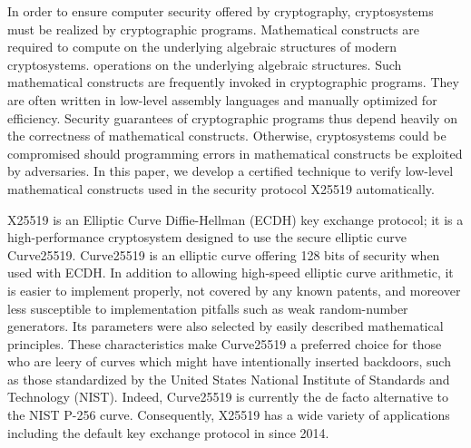 
In order to ensure computer security offered by cryptography,
cryptosystems must be realized by cryptographic programs. Mathematical
constructs are required to compute on the underlying algebraic
structures of modern cryptosystems.
operations on the underlying algebraic structures.
Such mathematical constructs are frequently invoked in cryptographic
programs. They are often written in low-level assembly languages and
manually optimized for efficiency. 
Security guarantees of cryptographic programs
thus depend heavily on the correctness of mathematical constructs.
Otherwise, cryptosystems could be compromised should programming
errors in mathematical constructs be exploited by adversaries.
In this paper, we develop a certified technique to verify low-level
mathematical constructs used in the security protocol X25519
automatically.

X25519 is an Elliptic Curve Diffie-Hellman (ECDH) key exchange
protocol; it is a high-performance cryptosystem designed to 
use the secure elliptic curve Curve25519. Curve25519 is an elliptic
curve offering 128 bits of security when used with ECDH. In addition
to allowing high-speed elliptic curve arithmetic, it is easier to
implement properly, not covered by any known patents, and moreover
less susceptible to implementation pitfalls such as weak 
random-number generators. Its parameters were also selected by
easily described mathematical principles.
These characteristics make Curve25519 a
preferred choice for those who are leery of curves which might have
intentionally inserted
backdoors, such as those standardized by the United States National
Institute of Standards and Technology (NIST). 
Indeed, Curve25519 is currently the
de facto alternative to the NIST P-256 curve. Consequently, X25519 has
a wide variety of applications including the default key exchange
protocol in \openssh since 2014.

